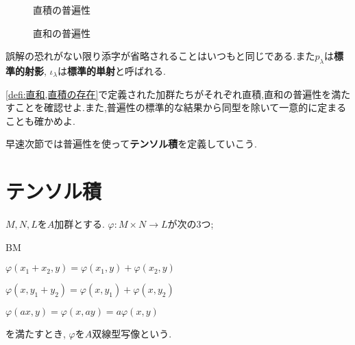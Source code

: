 \begin{minipage}{.45\textwidth}
	\begin{figure}[H]
		\centering
		\caption{直積の普遍性}
	\end{figure}
\end{minipage}
\hfill
\begin{minipage}{.45\textwidth}
	\begin{figure}[H]
		\centering
		\caption{直和の普遍性}
	\end{figure}
\end{minipage}

誤解の恐れがない限り添字が省略されることはいつもと同じである.また$p_\lambda$は\textbf{標準的射影}, $\iota_\lambda$は\textbf{標準的単射}と呼ばれる.

\begin{exer}
\ref{defi:直和,直積の存在}で定義された加群たちがそれぞれ直積,直和の普遍性を満たすことを確認せよ.また,普遍性の標準的な結果から同型を除いて一意的に定まることも確かめよ.
\end{exer}

早速次節では普遍性を使って\textbf{テンソル積}を定義していこう.

\section{テンソル積}

\begin{defi}[双線型写像]
	$M,N,L$を$A$加群とする. $\varphi:M\times N\to L$が次の3つ;
	\begin{defiterm}{BM}
		\item $\varphi(x_1+x_2,y)=\varphi(x_1,y)+\varphi(x_2,y)$
		\item $\varphi(x,y_1+y_2)=\varphi(x,y_1)+\varphi(x,y_2)$
		\item $\varphi(ax,y)=\varphi(x,ay)=a\varphi(x,y)$
	\end{defiterm}
	を満たすとき, $\varphi$を$A$双線型写像という.
\end{defi}

